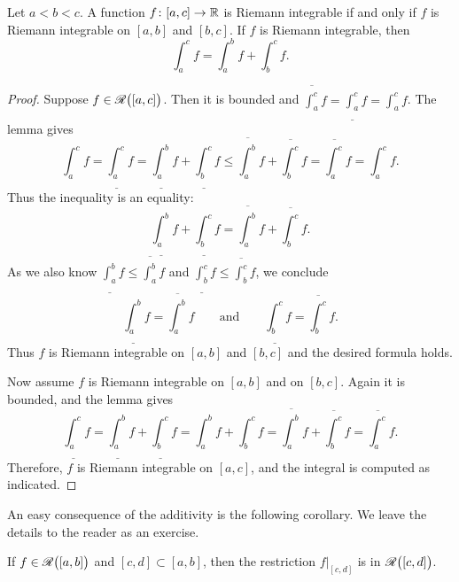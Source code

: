 \begin{prop}
Let $a < b < c$.  A function $f \colon [a,c] \to {\mathbb{R}}$ is Riemann integrable
if and only if $f$ is Riemann integrable on $[a,b]$ and $[b,c]$.  If
$f$ is Riemann integrable, then
\begin{equation*}
\int_a^c f
=
\int_a^b f
+
\int_b^c f .
\end{equation*}
\end{prop}

\begin{proof}
Suppose $f \in {\mathscr{R}}\bigl([a,c]\bigr)$.  Then it is bounded and
$\overline{\int_a^c} f = 
\underline{\int_a^c} f = 
\int_a^c f$.  The lemma gives
\begin{equation*}
\int_a^c f
=
\underline{\int_a^c} f
 =
\underline{\int_a^b} f + \underline{\int_b^c} f
 \leq
\overline{\int_a^b} f + \overline{\int_b^c} f
 =
\overline{\int_a^c} f
 =
\int_a^c f .
\end{equation*}
Thus the inequality is an equality:
\begin{equation*}
\underline{\int_a^b} f + \underline{\int_b^c} f
=
\overline{\int_a^b} f + \overline{\int_b^c} f .
\end{equation*}
As we also know 
$\underline{\int_a^b} f \leq \overline{\int_a^b} f$
and
$\underline{\int_b^c} f \leq \overline{\int_b^c} f$, we 
conclude 
\begin{equation*}
\underline{\int_a^b} f
=
\overline{\int_a^b} f
\qquad \text{and} \qquad
\underline{\int_b^c} f
=
\overline{\int_b^c} f .
\end{equation*}
Thus $f$ is Riemann integrable on $[a,b]$ and $[b,c]$ and the desired formula
holds.

Now assume $f$ is Riemann integrable on $[a,b]$ and on $[b,c]$.
Again it is bounded, and the lemma gives
\begin{equation*}
\underline{\int_a^c} f
=
\underline{\int_a^b} f + \underline{\int_b^c} f
=
\int_a^b f + \int_b^c f
=
\overline{\int_a^b} f + \overline{\int_b^c} f
=
\overline{\int_a^c} f .
\end{equation*}
Therefore, $f$ is Riemann integrable on $[a,c]$, and the integral is computed
as indicated.
\end{proof}

An easy consequence of the additivity is the following corollary.  We
leave the details to the reader as an exercise.

\begin{cor} \label{intsubcor}
If $f \in {\mathscr{R}}\bigl([a,b]\bigr)$ and
$[c,d] \subset [a,b]$, then
the restriction $f|_{[c,d]}$ is in ${\mathscr{R}}\bigl([c,d]\bigr)$.
\end{cor}

